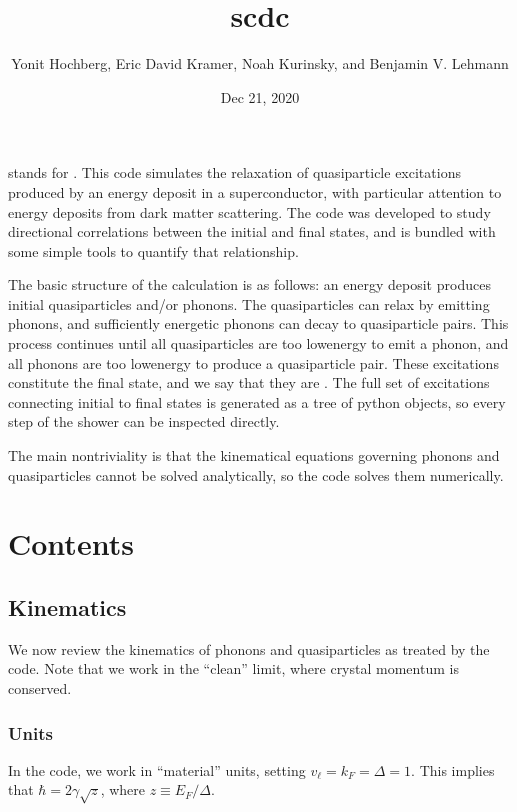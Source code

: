 \documentclass[letterpaper,10pt,english]{sphinxmanual}
\title{scdc}
\date{Dec 21, 2020}
\author{Yonit Hochberg, Eric David Kramer, Noah Kurinsky, and Benjamin V.\@{} Lehmann}
\begin{document}
\pagestyle{empty}
\sphinxmaketitle
\pagestyle{plain}
\sphinxtableofcontents
\pagestyle{normal}
\label{\detokenize{index::doc}}


 stands for . This code simulates the relaxation of quasiparticle excitations produced by an energy deposit in a superconductor, with particular attention to energy deposits from dark matter scattering. The code was developed to study directional correlations between the initial and final states, and is bundled with some simple tools to quantify that relationship.

The basic structure of the calculation is as follows: an energy deposit produces initial quasiparticles and/or phonons. The quasiparticles can relax by emitting phonons, and sufficiently energetic phonons can decay to quasiparticle pairs. This process continues until all quasiparticles are too low\sphinxhyphen{}energy to emit a phonon, and all phonons are too low\sphinxhyphen{}energy to produce a quasiparticle pair. These excitations constitute the final state, and we say that they are . The full set of excitations connecting initial to final states is generated as a tree of python objects, so every step of the shower can be inspected directly.

The main non\sphinxhyphen{}triviality is that the kinematical equations governing phonons and quasiparticles cannot be solved analytically, so the code solves them numerically.


\chapter{Contents}
\label{\detokenize{index:contents}}

\section{Kinematics}
\label{\detokenize{kinematics:kinematics}}\label{\detokenize{kinematics::doc}}
We now review the kinematics of phonons and quasiparticles as treated by the code. Note that we work in the “clean” limit, where crystal momentum is conserved.


\subsection{Units}
\label{\detokenize{kinematics:units}}
In the code, we work in “material” units, setting \(v_\ell = k_F = \Delta = 1\). This implies that \(\hbar = 2\gamma\sqrt z\), where \(z\equiv E_F/\Delta\).
\end{document}
